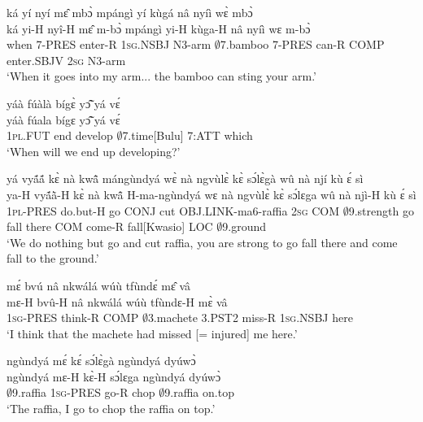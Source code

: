\begin{exe} 
\exC\label{14}
  \glll    ká yí nyí mɛ̂ mbɔ̀ mpángì yí kùgá nâ nyíì wɛ̀ mbɔ̀ \\
           ká yi-H nyî-H mɛ̂ m-bɔ̀ mpángì yi-H kùga-H nâ nyíì wɛ m-bɔ̀ \\
             when 7-PRES enter-R 1\textsc{sg}.NSBJ N3-arm $\emptyset$7.bamboo 7-PRES can-R COMP enter.SBJV 2\textsc{sg} N3-arm  \\
    \trans `When it goes into my arm... the bamboo can sting your arm.'
\end{exe}

\begin{exe} 
\exC\label{15}
  \glll     yáà fúàlà bígɛ̀ yɔ̃̂ yá vɛ́ \\
          yáà fúala bígɛ yɔ̃̂ yá vɛ́ \\
              1\textsc{pl}.FUT end develop $\emptyset$7.time[Bulu] 7:ATT which \\
    \trans `When will we end up developing?'
\end{exe}

\begin{exe} 
\exC\label{16}
  \glll     yá vyã́ã́ kɛ̀ nà kwã̂ mángùndyá wɛ̀ nà ngvùlɛ̀ kɛ̀ sɔ́lɛ̀gà wû nà njí kù ɛ́ sì \\
            ya-H vyã́ã̀-H kɛ̀ nà kwã̂ H-ma-ngùndyá wɛ nà ngvùlɛ̀ kɛ̀ sɔ́lɛga wû nà njì-H kù ɛ́ sì\\
              1\textsc{pl}-PRES do.but-H go CONJ cut OBJ.LINK-ma6-raffia 2\textsc{sg} COM $\emptyset$9.strength go fall there COM come-R fall[Kwasio] LOC $\emptyset$9.ground\\
    \trans `We do nothing but go and cut raffia, you are strong to go fall there and come fall to the ground.'
\end{exe}

\begin{exe} 
\exC\label{17}
  \glll    mɛ́ bvú nâ nkwálá wúù tfùndɛ́ mɛ̂ vâ \\
           mɛ-H bvû-H nâ nkwálá wúù tfùndɛ-H mɛ̀ vâ \\
              1\textsc{sg}-PRES think-R COMP $\emptyset$3.machete 3.PST2 miss-R 1\textsc{sg}.NSBJ here \\
    \trans `I think that the machete had missed [= injured] me here.'
\end{exe}

\begin{exe} 
\exC\label{18}
  \glll    ngùndyá mɛ́ kɛ́ sɔ́lɛ̀gà ngùndyá dyúwɔ̀ \\
          ngùndyá mɛ-H kɛ̀-H sɔ́lɛga ngùndyá dyúwɔ̀ \\
              $\emptyset$9.raffia 1\textsc{sg}-PRES go-R chop $\emptyset$9.raffia on.top \\
    \trans `The raffia, I go to chop the raffia on top.'
\end{exe}

